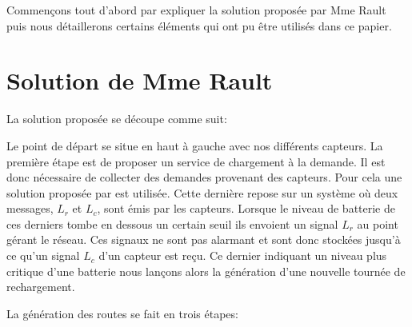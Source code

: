 \documentclass[noposter]{polytech}
\begin{document}
	Commençons tout d'abord par expliquer la solution proposée par Mme Rault puis nous détaillerons certains éléments qui ont pu être utilisés dans ce papier.
			
	\section{Solution de Mme Rault}
		La solution proposée se découpe comme suit:
	
	
		Le point de départ se situe en haut à gauche avec nos différents capteurs.
		La première étape est de proposer un service de chargement à la demande.
		Il est donc nécessaire de collecter des demandes provenant des capteurs.
		Pour cela une solution proposée par \cite{KHELLADI201744} est utilisée.
		Cette dernière repose sur un système où deux messages, $L_r$ et $L_c$, sont émis par les capteurs.
		Lorsque le niveau de batterie de ces derniers tombe en dessous un certain seuil ils envoient un signal $L_r$ au point gérant le réseau.
		Ces signaux ne sont pas alarmant et sont donc stockées jusqu'à ce qu'un signal $L_c$ d'un capteur est reçu.
		Ce dernier indiquant un niveau plus critique d'une batterie nous lançons alors la génération d'une nouvelle tournée de rechargement.
	
		La génération des routes se fait en trois étapes:
	
\end{document}
